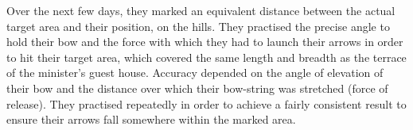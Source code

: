 Over the next few days, they marked an equivalent distance between the actual
target area and their position, on the hills. They practised the precise angle
to hold their bow and the force with which they had to launch their arrows in
order to hit their target area, which covered the same length and breadth as the
terrace of the minister's guest house. Accuracy depended on the angle of
elevation of their bow and the distance over which their bow-string was
stretched (force of release). They practised repeatedly in order to achieve a
fairly consistent result to ensure their arrows fall somewhere within the marked
area.